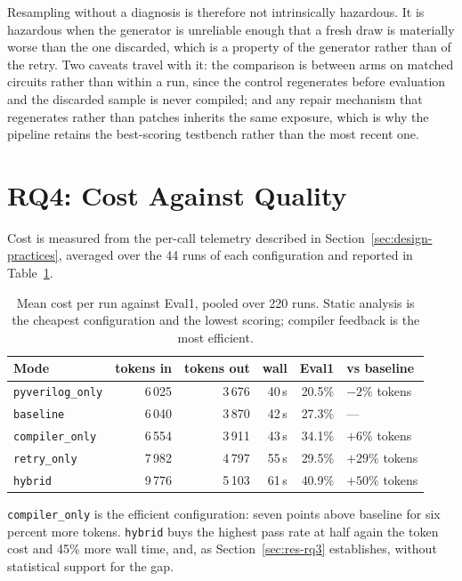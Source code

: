 \documentclass[11pt,a4paper,titlepage=false]{scrreprt}
\begin{document}
Resampling without a diagnosis is therefore not intrinsically hazardous. It is hazardous when
the generator is unreliable enough that a fresh draw is materially worse than the one
discarded, which is a property of the generator rather than of the retry. Two caveats travel
with it: the comparison is between arms on matched circuits rather than within a run, since
the control regenerates before evaluation and the discarded sample is never compiled; and any
repair mechanism that regenerates rather than patches inherits the same exposure, which is
why the pipeline retains the best-scoring testbench rather than the most recent one.

\section{RQ4: Cost Against Quality}\label{sec:res-rq4}

Cost is measured from the per-call telemetry described in
Section~\ref{sec:design-practices}, averaged over the 44 runs of each configuration and
reported in Table~\ref{tab:cost}.

\begin{table}[H]
\centering
\small
\begin{tabular}{@{}l r r r r l@{}}
\toprule
\textbf{Mode} & \textbf{tokens in} & \textbf{tokens out} & \textbf{wall} & \textbf{Eval1} & \textbf{vs baseline} \\
\midrule
\texttt{pyverilog\_only} & 6\,025 & 3\,676 & 40\,s & 20.5\% & $-2\%$ tokens \\
\texttt{baseline}        & 6\,040 & 3\,870 & 42\,s & 27.3\% & --- \\
\texttt{compiler\_only}  & 6\,554 & 3\,911 & 43\,s & 34.1\% & $+6\%$ tokens \\
\texttt{retry\_only}     & 7\,982 & 4\,797 & 55\,s & 29.5\% & $+29\%$ tokens \\
\texttt{hybrid}          & 9\,776 & 5\,103 & 61\,s & 40.9\% & $+50\%$ tokens \\
\bottomrule
\end{tabular}
\caption{Mean cost per run against Eval1, pooled over 220 runs. Static analysis is the cheapest configuration and the lowest scoring; compiler feedback is the most efficient.}
\label{tab:cost}
\end{table}

\texttt{compiler\_only} is the efficient configuration: seven points above baseline for six
percent more tokens. \texttt{hybrid} buys the highest pass rate at half again the token cost
and 45\% more wall time, and, as Section~\ref{sec:res-rq3} establishes, without statistical
support for the gap.
\end{document}

